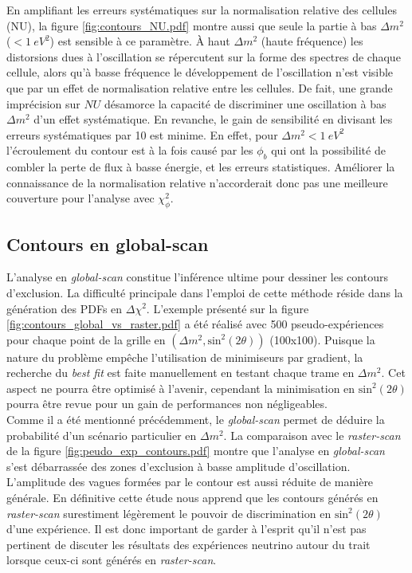 En amplifiant les erreurs systématiques sur la normalisation relative des cellules (NU), la figure \ref{fig:contours_NU.pdf} montre aussi que seule la partie à bas $\Delta m^2$ ($< \SI{1}{eV^2}$) est sensible à ce paramètre. À haut $\Delta m^2$ (haute fréquence) les distorsions dues à l'oscillation se répercutent sur la forme des spectres de chaque cellule, alors qu'à basse fréquence le développement de l'oscillation n'est visible que par un effet de normalisation relative entre les cellules. De fait, une grande imprécision sur $NU$ désamorce la capacité de discriminer une oscillation à bas $\Delta m^2$ d'un effet systématique. En revanche, le gain de sensibilité en divisant les erreurs systématiques par 10 est minime. En effet, pour $\Delta m^2 < \SI{1}{eV^2}$  l'écroulement du contour est à la fois causé par les $\phi_b$ qui ont la possibilité de combler la perte de flux à basse énergie, et les erreurs statistiques. Améliorer la connaissance de la normalisation relative n'accorderait donc pas une meilleure couverture pour l'analyse avec $\chi^2_\phi$.

\bigbreak

\subsection{Contours en global-scan}
\label{sec:global_scan_example}

L'analyse en \textit{global-scan} constitue l'inférence ultime pour dessiner les contours d'exclusion. La difficulté principale dans l'emploi de cette méthode réside dans la génération des PDFs en $\Delta \chi^2$. L'exemple présenté sur la figure \ref{fig:contours_global_vs_raster.pdf} a été réalisé avec 500 pseudo-expériences pour chaque point de la grille en $(\Delta m^2, \textrm{sin}^2(2\theta))$ (100x100). Puisque la nature du problème empêche l'utilisation de minimiseurs par gradient, la recherche du \textit{best fit} est faite manuellement en testant chaque trame en $\Delta m^2$. Cet aspect ne pourra être optimisé à l'avenir, cependant la minimisation en $\textrm{sin}^2(2\theta)$ pourra être revue pour un gain de performances non négligeables.\\

Comme il a été mentionné précédemment, le \textit{global-scan} permet de déduire la probabilité d'un scénario particulier en $\Delta m^2$. La comparaison avec le \textit{raster-scan} de la figure \ref{fig:peudo_exp_contours.pdf} montre que l'analyse en \textit{global-scan} s'est débarrassée des zones d'exclusion à basse amplitude d'oscillation. L'amplitude des vagues formées par le contour est aussi réduite de manière générale. En définitive cette étude nous apprend que les contours générés en \textit{raster-scan} surestiment légèrement le pouvoir de discrimination en $\textrm{sin}^2(2\theta)$ d'une expérience. Il est donc important de garder à l'esprit qu'il n'est pas pertinent de discuter les résultats des expériences neutrino autour du trait lorsque ceux-ci sont générés en \textit{raster-scan}.

\bigbreak




